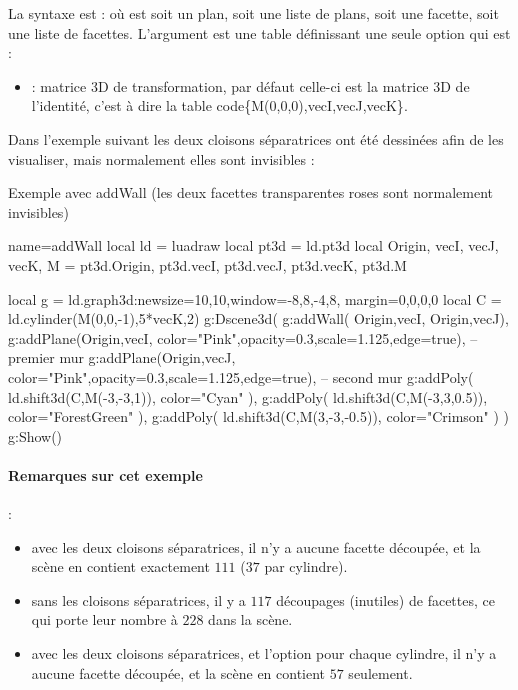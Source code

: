 La syntaxe est :  où  est soit un plan, soit une liste de plans, soit une facette, soit une liste de facettes. L'argument  est une table définissant une seule option qui est :
\begin{itemize}
    \item {} : matrice 3D de transformation, par défaut celle-ci est la matrice 3D de l'identité, c'est à dire la table code{\{M(0,0,0),vecI,vecJ,vecK\}}.
\end{itemize}

Dans l'exemple suivant les deux cloisons séparatrices ont été dessinées afin de les visualiser, mais normalement elles sont invisibles :

\begin{demo}{Exemple avec addWall (les deux facettes transparentes roses sont normalement invisibles)}
\begin{luadraw}{name=addWall}
local ld = luadraw
local pt3d = ld.pt3d
local Origin, vecI, vecJ, vecK, M = pt3d.Origin, pt3d.vecI, pt3d.vecJ, pt3d.vecK, pt3d.M

local g = ld.graph3d:new{size={10,10},window={-8,8,-4,8}, margin={0,0,0,0}}
local C = ld.cylinder(M(0,0,-1),5*vecK,2)
g:Dscene3d(
    g:addWall( {{Origin,vecI}, {Origin,vecJ}}),
    g:addPlane({Origin,vecI}, {color="Pink",opacity=0.3,scale=1.125,edge=true}), -- premier mur
    g:addPlane({Origin,vecJ}, {color="Pink",opacity=0.3,scale=1.125,edge=true}), -- second mur
    g:addPoly( ld.shift3d(C,M(-3,-3,1)), {color="Cyan"} ),
    g:addPoly( ld.shift3d(C,M(-3,3,0.5)), {color="ForestGreen"} ),
    g:addPoly( ld.shift3d(C,M(3,-3,-0.5)), {color="Crimson"} )
)
g:Show()
\end{luadraw}
\end{demo}

\paragraph{Remarques sur cet exemple} : 
\begin{itemize}
    \item avec les deux cloisons séparatrices, il n'y a aucune facette découpée, et la scène en contient exactement $111$ ($37$ par cylindre).
    \item sans les cloisons séparatrices, il y a $117$ découpages (inutiles) de facettes, ce qui porte leur nombre à $228$ dans la scène.
        \item avec les deux cloisons séparatrices, et l'option  pour chaque cylindre, il n'y a aucune facette découpée, et la scène en contient $57$ seulement.
\end{itemize}

